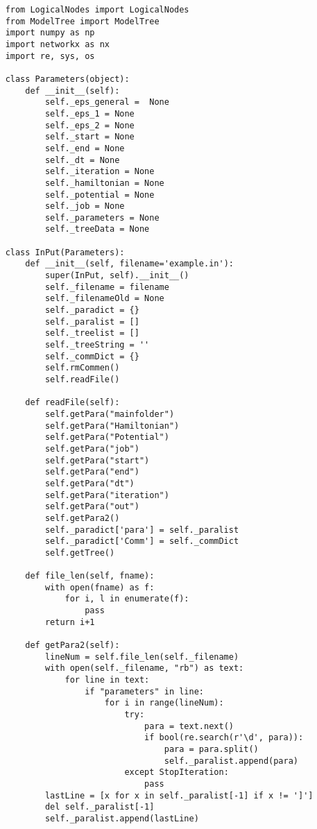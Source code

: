 \begin{verbatim}
    from LogicalNodes import LogicalNodes
    from ModelTree import ModelTree
    import numpy as np
    import networkx as nx
    import re, sys, os
    
    class Parameters(object):
        def __init__(self):
            self._eps_general =  None
            self._eps_1 = None
            self._eps_2 = None
            self._start = None
            self._end = None
            self._dt = None
            self._iteration = None
            self._hamiltonian = None
            self._potential = None
            self._job = None
            self._parameters = None
            self._treeData = None
    
    class InPut(Parameters):
        def __init__(self, filename='example.in'):
            super(InPut, self).__init__()
            self._filename = filename
            self._filenameOld = None
            self._paradict = {}
            self._paralist = []
            self._treelist = []
            self._treeString = ''
            self._commDict = {}
            self.rmCommen()
            self.readFile()
    
        def readFile(self):
            self.getPara("mainfolder")
            self.getPara("Hamiltonian")
            self.getPara("Potential")
            self.getPara("job")
            self.getPara("start")
            self.getPara("end")
            self.getPara("dt")
            self.getPara("iteration")
            self.getPara("out")
            self.getPara2()
            self._paradict['para'] = self._paralist
            self._paradict['Comm'] = self._commDict
            self.getTree()
    
        def file_len(self, fname):
            with open(fname) as f:
                for i, l in enumerate(f):
                    pass
            return i+1
    
        def getPara2(self):
            lineNum = self.file_len(self._filename)
            with open(self._filename, "rb") as text:
                for line in text:
                    if "parameters" in line:
                        for i in range(lineNum):
                            try:
                                para = text.next()
                                if bool(re.search(r'\d', para)):
                                    para = para.split()     
                                    self._paralist.append(para)
                            except StopIteration:
                                pass
            lastLine = [x for x in self._paralist[-1] if x != ']']
            del self._paralist[-1]
            self._paralist.append(lastLine)
    

\end{verbatim}
